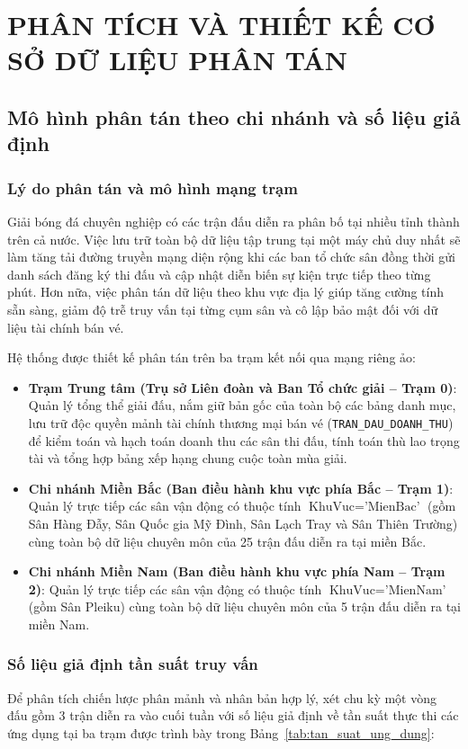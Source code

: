 \chapter{PHÂN TÍCH VÀ THIẾT KẾ CƠ SỞ DỮ LIỆU PHÂN TÁN}

\section{Mô hình phân tán theo chi nhánh và số liệu giả định}

\subsection{Lý do phân tán và mô hình mạng trạm}
Giải bóng đá chuyên nghiệp có các trận đấu diễn ra phân bố tại nhiều tỉnh thành trên cả nước. Việc lưu trữ toàn bộ dữ liệu tập trung tại một máy chủ duy nhất sẽ làm tăng tải đường truyền mạng diện rộng khi các ban tổ chức sân đồng thời gửi danh sách đăng ký thi đấu và cập nhật diễn biến sự kiện trực tiếp theo từng phút. Hơn nữa, việc phân tán dữ liệu theo khu vực địa lý giúp tăng cường tính sẵn sàng, giảm độ trễ truy vấn tại từng cụm sân và cô lập bảo mật đối với dữ liệu tài chính bán vé.

Hệ thống được thiết kế phân tán trên ba trạm kết nối qua mạng riêng ảo:
\begin{itemize}
    \item \textbf{Trạm Trung tâm (Trụ sở Liên đoàn và Ban Tổ chức giải -- Trạm 0)}: Quản lý tổng thể giải đấu, nắm giữ bản gốc của toàn bộ các bảng danh mục, lưu trữ độc quyền mảnh tài chính thương mại bán vé (\texttt{TRAN\_DAU\_DOANH\_THU}) để kiểm toán và hạch toán doanh thu các sân thi đấu, tính toán thù lao trọng tài và tổng hợp bảng xếp hạng chung cuộc toàn mùa giải.
    \item \textbf{Chi nhánh Miền Bắc (Ban điều hành khu vực phía Bắc -- Trạm 1)}: Quản lý trực tiếp các sân vận động có thuộc tính $\text{KhuVuc} = \text{'MienBac'}$ (gồm Sân Hàng Đẫy, Sân Quốc gia Mỹ Đình, Sân Lạch Tray và Sân Thiên Trường) cùng toàn bộ dữ liệu chuyên môn của 25 trận đấu diễn ra tại miền Bắc.
    \item \textbf{Chi nhánh Miền Nam (Ban điều hành khu vực phía Nam -- Trạm 2)}: Quản lý trực tiếp các sân vận động có thuộc tính $\text{KhuVuc} = \text{'MienNam'}$ (gồm Sân Pleiku) cùng toàn bộ dữ liệu chuyên môn của 5 trận đấu diễn ra tại miền Nam.
\end{itemize}

\subsection{Số liệu giả định tần suất truy vấn}
Để phân tích chiến lược phân mảnh và nhân bản hợp lý, xét chu kỳ một vòng đấu gồm 3 trận diễn ra vào cuối tuần với số liệu giả định về tần suất thực thi các ứng dụng tại ba trạm được trình bày trong Bảng~\ref{tab:tan_suat_ung_dung}:

